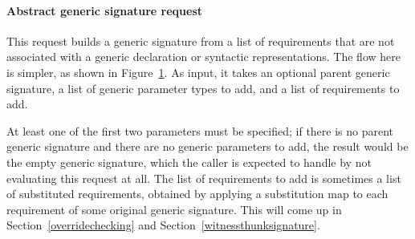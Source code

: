 \documentclass[../generics]{subfiles}
\begin{document}
\begin{figure}\label{abstract generic signature request figure}
\begin{center}
\end{center}
\end{figure}

\paragraph{Abstract generic signature request}
%
%
%
This request builds a generic signature from a list of requirements that are not associated with a generic declaration or syntactic representations. The flow here is simpler, as shown in Figure~\ref{abstract generic signature request figure}. As input, it takes an optional parent generic signature, a list of generic parameter types to add, and a list of requirements to add.

At least one of the first two parameters must be specified; if there is no parent generic signature and there are no generic parameters to add, the result would be the empty generic signature, which the caller is expected to handle by not evaluating this request at all. The list of requirements to add is sometimes a list of substituted requirements, obtained by applying a substitution map to each requirement of some original generic signature. This will come up in Section~\ref{overridechecking} and Section~\ref{witnessthunksignature}.
\end{document}
